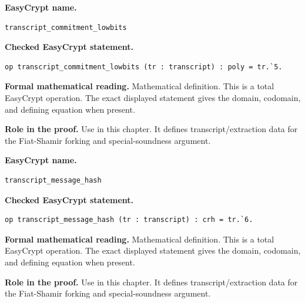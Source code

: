 \begin{formaldefinition}
\noindent\textbf{EasyCrypt name.}
\begin{lstlisting}[language=EasyCrypt,basicstyle=\ttfamily\scriptsize]
transcript_commitment_lowbits
\end{lstlisting}
\noindent\textbf{Checked EasyCrypt statement.}
\begin{lstlisting}[language=EasyCrypt,basicstyle=\ttfamily\scriptsize]
op transcript_commitment_lowbits (tr : transcript) : poly = tr.`5.
\end{lstlisting}
\noindent\textbf{Formal mathematical reading.}
Mathematical definition. This is a total EasyCrypt operation.  The exact displayed statement gives the domain, codomain, and defining equation when present.

\noindent\textbf{Role in the proof.}
Use in this chapter. It defines transcript/extraction data for the Fiat-Shamir forking and special-soundness argument.

\end{formaldefinition}

\begin{formaldefinition}
\noindent\textbf{EasyCrypt name.}
\begin{lstlisting}[language=EasyCrypt,basicstyle=\ttfamily\scriptsize]
transcript_message_hash
\end{lstlisting}
\noindent\textbf{Checked EasyCrypt statement.}
\begin{lstlisting}[language=EasyCrypt,basicstyle=\ttfamily\scriptsize]
op transcript_message_hash (tr : transcript) : crh = tr.`6.
\end{lstlisting}
\noindent\textbf{Formal mathematical reading.}
Mathematical definition. This is a total EasyCrypt operation.  The exact displayed statement gives the domain, codomain, and defining equation when present.

\noindent\textbf{Role in the proof.}
Use in this chapter. It defines transcript/extraction data for the Fiat-Shamir forking and special-soundness argument.

\end{formaldefinition}

